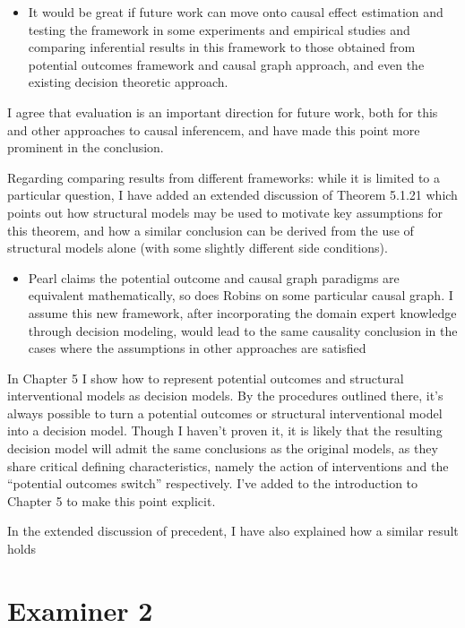 \begin{itemize}
    \item It would be great if future work can move onto causal effect estimation and testing the framework in some experiments and empirical studies and comparing inferential results in this framework to those obtained from potential outcomes framework and causal graph approach, and even the existing decision theoretic approach.
\end{itemize}

I agree that evaluation is an important direction for future work, both for this and other approaches to causal inferencem, and have made this point more prominent in the conclusion.

Regarding comparing results from different frameworks: while it is limited to a particular question, I have added an extended discussion of Theorem 5.1.21 which points out how structural models may be used to motivate key assumptions for this theorem, and how a similar conclusion can be derived from the use of structural models alone (with some slightly different side conditions).

\begin{itemize}
    \item Pearl claims the potential outcome and causal graph paradigms are equivalent mathematically, so does Robins on some particular causal graph. I assume this new framework, after incorporating the domain expert knowledge through decision modeling, would lead to the same causality conclusion in the cases where the assumptions in other approaches are satisfied
\end{itemize}

In Chapter 5 I show how to represent potential outcomes and structural interventional models as decision models. By the procedures outlined there, it's always possible to turn a potential outcomes or structural interventional model into a decision model. Though I haven't proven it, it is likely that the resulting decision model will admit the same conclusions as the original models, as they share critical defining characteristics, namely the action of interventions and the ``potential outcomes switch'' respectively. I've added to the introduction to Chapter 5 to make this point explicit.

In the extended discussion of precedent, I have also explained how a similar result holds 

\section{Examiner 2}

